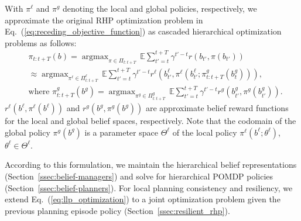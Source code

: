 \documentclass[letterpaper]{article} %
\newcommand{\phdone}[1]{} %
\newcommand{\argmax}{\mathop{\mathrm{argmax}}}
\begin{document}
With $\pi^\ell$ and $\pi^g$ denoting the local and global policies, respectively, we approximate the original RHP optimization problem in Eq.~(\ref{eq:receding_objective_function}) as cascaded hierarchical optimization problems as follows:
\begin{align}
  &\pi_{t:t+T}(b)
  = \argmax_{\pi \in \Pi_{t:t+T}} \, \mathbb{E} \sum_{t'=t}^{t+T} \gamma^{t'-t} r(b_{t'}, \pi(b_{t'}))
  \nonumber \\
  & \approx \argmax_{\pi^\ell \in \Pi^\ell_{t:t+T}} \, \mathbb{E} \sum_{t'=t}^{t+T} \gamma^{t'-t} r^\ell(b^\ell_{t'}, \pi^\ell(b^\ell_{t'}; \pi_{t:t+T}^g(b^g_t))),
  \label{eq:llp_optimization}
  \\
  &\text{where }
  \pi_{t:t+T}^g(b^g) = \argmax_{\pi^g \in \Pi^g_{t:t+T}} \, \mathbb{E} \sum_{t'=t}^{t+T} \gamma^{t'-t} r^g(b^g_{t'}, \pi^g(b^g_{t'})).
  \label{eq:glp_optimization}
\end{align}
\normalsize
$r^\ell(b^\ell, \pi^\ell(b^\ell))$ and $r^g(b^g, \pi^g(b^g))$ are approximate belief reward functions for the local and global belief spaces, respectively.
%
Note that the codomain of the global policy $\pi^g(b^g)$ is a parameter space $\Theta^\ell$ of the local policy $\pi^\ell(b^\ell; \theta^\ell)$, $\theta^\ell \!\! \in \! \Theta^\ell\!$.\,

\phdone{Section Structure}
According to this formulation, we maintain the hierarchical belief representations (Section~\ref{ssec:belief-managers}) and solve for hierarchical POMDP policies (Section~\ref{ssec:belief-planners}).
For local planning consistency and resiliency, we extend Eq.~(\ref{eq:llp_optimization}) to a joint optimization problem given the previous planning episode policy (Section~\ref{ssec:resilient_rhp}).




\end{document}
